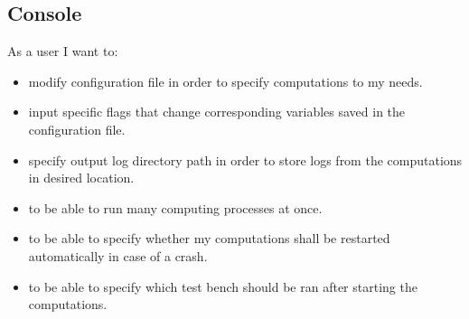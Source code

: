 \documentclass{article}
\begin{document}
\subsection{Console}
As a user I want to:
\begin{itemize}
	\item 
		modify configuration file in order to specify computations to my needs.

	\item 
		input specific flags that change corresponding variables saved in the configuration file.
		
	\item 
		specify output log directory path in order to store logs from the computations in desired location.
		
	\item 
		to be able to run many computing processes at once.
	
	\item
		to be able to specify whether my computations shall be restarted automatically in case of a crash.

	\item
		to be able to specify which test bench should be ran after starting the computations.
				

		
\end{itemize}


%
%
\end{document}
